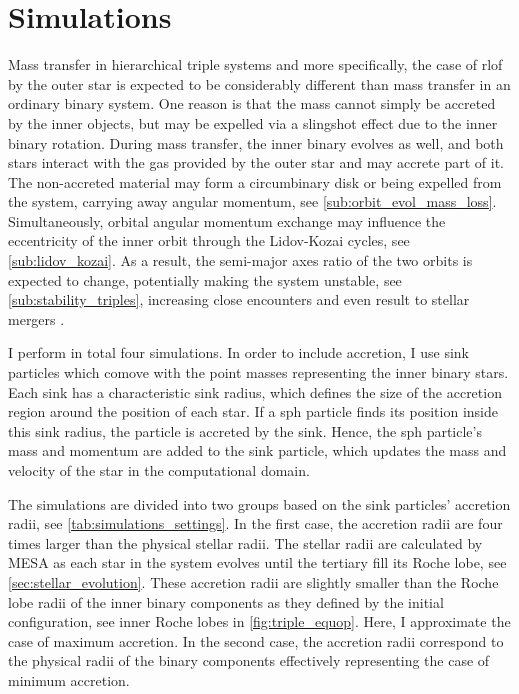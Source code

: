 \section{Simulations}\label{simulations}

Mass transfer in hierarchical triple
systems and more specifically, the case of \ac{rlof} by the outer star is expected to be considerably different than mass transfer in an ordinary binary system. One reason is that the mass cannot simply be accreted by the inner
objects, but may be expelled via a slingshot effect due to the inner binary rotation. During mass transfer, the inner binary evolves as well, and both stars interact with the gas provided by the outer star and may accrete part of it. The non-accreted material may form a circumbinary disk or being expelled from the system, carrying away angular momentum, see \cref{sub:orbit_evol_mass_loss}. Simultaneously, orbital angular momentum exchange may influence the eccentricity of the inner orbit through the Lidov-Kozai cycles, see \cref{sub:lidov_kozai}. As a result, the semi-major axes ratio of the two orbits is expected to change, potentially making the system unstable, see \cref{sub:stability_triples}, increasing close encounters and even result to stellar mergers \citep{antonini2017binary,silsbee2017lidov,vigna2021massive}.

I perform in total four simulations. In order to include accretion, I use sink particles which comove with the point masses representing the inner binary stars. Each sink has a characteristic sink radius, which defines the size of the accretion region around the position of each star. If a \ac{sph} particle finds its position inside this sink radius, the particle is accreted by the sink. Hence, the \ac{sph} particle's mass and momentum are added to the sink particle, which updates the mass and velocity of the star in the computational domain.

The simulations are divided into two groups based on the sink particles' accretion radii, see \cref{tab:simulations_settings}. In the first case, the accretion radii are four times larger than the physical stellar radii. The stellar radii are calculated by MESA as each star in the system evolves until the tertiary fill its Roche lobe, see \cref{sec:stellar_evolution}. These accretion radii are slightly smaller than the Roche lobe radii of the inner binary components as they defined by the initial configuration, see inner Roche lobes in \cref{fig:triple_equop}. Here, I approximate the case of maximum accretion. In the second case, the accretion radii correspond to the physical radii of the binary components effectively representing the case of minimum accretion.

